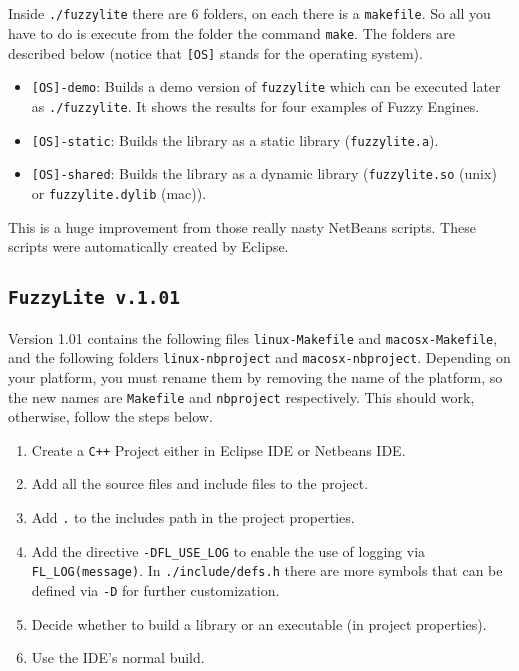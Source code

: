 \subsection{\fl}
	Inside \texttt{./fuzzylite} there are 6 folders, on each there is a
	\texttt{makefile}. So all you have to do is execute from the folder the
	command \texttt{make}. The folders are described below (notice that
	\texttt{[OS]} stands for the operating system).
	\begin{itemize}	
	  \item \texttt{[OS]-demo}: Builds a demo version of \texttt{fuzzylite} which
	  can be executed later as \texttt{./fuzzylite}. It shows the results for four
	  examples of Fuzzy Engines.
	  \item \texttt{[OS]-static}: Builds the library as a static library
	  (\texttt{fuzzylite.a}).
	  \item \texttt{[OS]-shared}: Builds the library as a dynamic library
	  (\texttt{fuzzylite.so} (unix) or \texttt{fuzzylite.dylib} (mac)).
\end{itemize}

	This is a huge improvement from those really nasty NetBeans scripts. These
	scripts were automatically created by Eclipse.

\subsection{\texttt{FuzzyLite v.1.01}}

	Version 1.01 contains the following files \texttt{linux-Makefile} and \texttt{macosx-Makefile}, and the following folders \texttt{linux-nbproject} and \texttt{macosx-nbproject}. Depending on your platform, you must rename them by removing the name of the platform, so the new names are \texttt{Makefile} and \texttt{nbproject} respectively. This should work, otherwise, follow the steps below.

	\begin{enumerate}
		\item Create a \texttt{C++} Project either in Eclipse IDE or Netbeans IDE.
		\item Add all the source files and include files to the project.
		\item Add \texttt{.} to the includes path in the project properties.
		\item Add the directive \texttt{-DFL\_USE\_LOG} to enable the use of logging via \texttt{FL\_LOG(message)}. In \texttt{./include/defs.h} there are more symbols that can be defined via \texttt{-D} for further customization.
		\item Decide whether to build a library or an executable (in project properties).
		\item Use the IDE's normal build.
	\end{enumerate}

